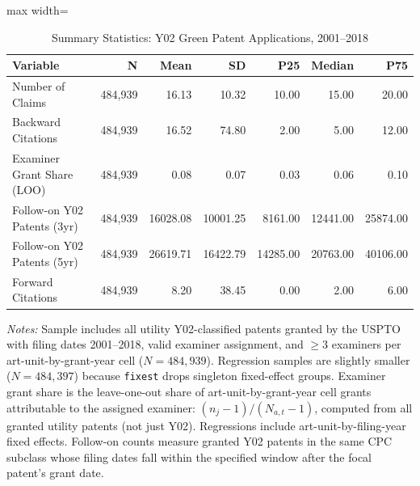 \begin{table}[htbp]
\centering
\caption{Summary Statistics: Y02 Green Patent Applications, 2001--2018}
\label{tab:summary}
\begin{adjustbox}{max width=\textwidth}
\begin{tabular}{lrrrrrr}
\hline\hline
Variable & N & Mean & SD & P25 & Median & P75 \\
\hline
Number of Claims & 484,939 & 16.13 & 10.32 & 10.00 & 15.00 & 20.00 \\
Backward Citations & 484,939 & 16.52 & 74.80 & 2.00 & 5.00 & 12.00 \\
Examiner Grant Share (LOO) & 484,939 & 0.08 & 0.07 & 0.03 & 0.06 & 0.10 \\
Follow-on Y02 Patents (3yr) & 484,939 & 16028.08 & 10001.25 & 8161.00 & 12441.00 & 25874.00 \\
Follow-on Y02 Patents (5yr) & 484,939 & 26619.71 & 16422.79 & 14285.00 & 20763.00 & 40106.00 \\
Forward Citations & 484,939 & 8.20 & 38.45 & 0.00 & 2.00 & 6.00 \\
\hline\hline
\end{tabular}
\end{adjustbox}
\begin{minipage}{0.95\textwidth}
\footnotesize
\textit{Notes:} Sample includes all utility Y02-classified patents granted by the USPTO with filing dates 2001--2018, valid examiner assignment, and $\geq 3$ examiners per art-unit-by-grant-year cell ($N = 484{,}939$). Regression samples are slightly smaller ($N = 484{,}397$) because \texttt{fixest} drops singleton fixed-effect groups. Examiner grant share is the leave-one-out share of art-unit-by-grant-year cell grants attributable to the assigned examiner: $(n_j - 1)/(N_{a,t} - 1)$, computed from all granted utility patents (not just Y02). Regressions include art-unit-by-filing-year fixed effects. Follow-on counts measure granted Y02 patents in the same CPC subclass whose filing dates fall within the specified window after the focal patent's grant date. \end{minipage}
\end{table}
